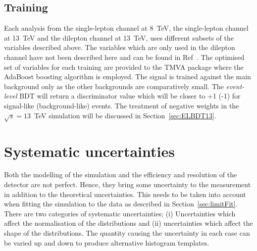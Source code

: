 \subsection{Training}
Each analysis from the single-lepton channel at 8~TeV, the single-lepton channel at 13~TeV and the dilepton channel at 13~TeV, uses different subsets of the variables described above. The variables which are only used in the dilepton channel have not been described here and can be found in Ref~\cite{CMS-PAS-TOP-16-016}. The optimised set of variables for each training are provided to the TMVA package where the AdaBoost boosting algorithm is employed. The \tttt signal is trained against the main \ttbar background only as the other backgrounds are comparatively small. The \emph{event-level} BDT will return a discriminator value which will be closer to +1 (-1) for signal-like (background-like) events. The treatment of negative weights in the $\sqrt{s}=13$~TeV simulation will be discussed in Section~\ref{sec:ELBDT13}.

\section{Systematic uncertainties}
\label{sec:uncertainties}

Both the modelling of the simulation and the efficiency and resolution of the detector are not perfect. Hence, they bring some uncertainty to the measurement in addition to the theoretical uncertainties. This needs to be taken into account when fitting the simulation to the data as described in Section~\ref{sec:limitFit}.
There are two categories of systematic uncertainties; (i) Uncertainties which affect the normalisation of the distributions and (ii) uncertainties which affect the shape of the distributions. The quantity causing the uncertainty in each case can be varied up and down to produce alternative histogram templates.

